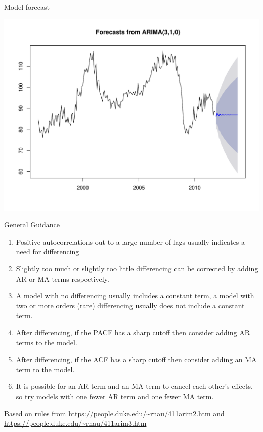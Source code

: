 \documentclass[11pt,ignorenonframetext,]{beamer}
\newenvironment{Shaded}{}{}
\newcommand{\KeywordTok}[1]{\textcolor[rgb]{0.00,0.44,0.13}{\textbf{#1}}}
\newcommand{\DataTypeTok}[1]{\textcolor[rgb]{0.56,0.13,0.00}{#1}}
\newcommand{\DecValTok}[1]{\textcolor[rgb]{0.25,0.63,0.44}{#1}}
\newcommand{\StringTok}[1]{\textcolor[rgb]{0.25,0.44,0.63}{#1}}
\newcommand{\OperatorTok}[1]{\textcolor[rgb]{0.40,0.40,0.40}{#1}}
\newcommand{\NormalTok}[1]{#1}
\let\oldShaded\Shaded
\let\endoldShaded\endShaded
\renewenvironment{Shaded}{\footnotesize\begin{spacing}{0.9}\oldShaded}{\endoldShaded\end{spacing}}
\begin{document}
\begin{frame}[fragile]{Model forecast}

\begin{Shaded}
\end{Shaded}

\includegraphics{Lec9_files/figure-beamer/unnamed-chunk-21-1.pdf}

\end{frame}

\begin{frame}[t]{General Guidance}

\begin{enumerate}
\def\labelenumi{\arabic{enumi}.}
\item
  Positive autocorrelations out to a large number of lags usually
  indicates a need for differencing
\item
  Slightly too much or slightly too little differencing can be corrected
  by adding AR or MA terms respectively.
\item
  A model with no differencing usually includes a constant term, a model
  with two or more orders (rare) differencing usually does not include a
  constant term.
\item
  After differencing, if the PACF has a sharp cutoff then consider
  adding AR terms to the model.
\item
  After differencing, if the ACF has a sharp cutoff then consider adding
  an MA term to the model.
\item
  It is possible for an AR term and an MA term to cancel each other's
  effects, so try models with one fewer AR term and one fewer MA term.
\end{enumerate}

\scriptsize{Based on rules from \url{https://people.duke.edu/~rnau/411arim2.htm} and \url{https://people.duke.edu/~rnau/411arim3.htm}}

\end{frame}
\end{document}
